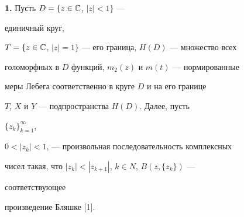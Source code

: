  


\date{} 




\pagestyle{plain} %


 




\maketitle 


\label{begin} 


 


 


{\bf 1.} Пусть $D=\{z\in\Bbb C$, $|z|<1\}$ --- 


единичный круг, 


$T=\{z\in\Bbb C$, $|z|=1\}$ --- его граница, $H(D)$ --- множество всех 


голоморфных в $D$ функций, $m_2(z)$ и $m(t)$ --- нормированные


меры Лебега соответственно в круге $D$ и на его границе 


$T$, $X$ и $Y$ --- подпространства $H(D)$. Далее, пусть 


$\{z_k\}^\infty_{k=1}$, 


$0<|z_k|<1$, --- произвольная последовательность комплексных 


чисел такая, что $|z_k|<|z_{k+1}|$, $k\in N$, $B(z,\{z_k\})$ --- 


соответствующее 


произведение Бляшке [1]. 


 


